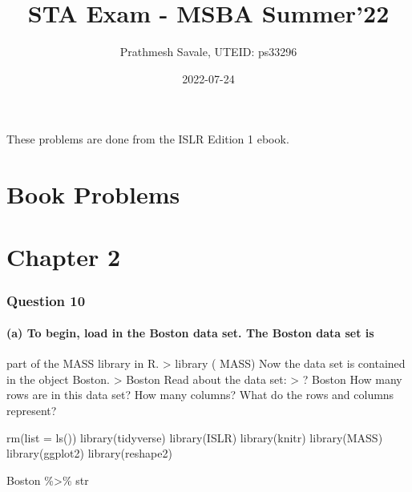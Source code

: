 \documentclass[
]{article}
\title{STA Exam - MSBA Summer'22}
\author{Prathmesh Savale, UTEID: ps33296}
\date{2022-07-24}
\newenvironment{Shaded}{\begin{snugshade}}{\end{snugshade}}
\newcommand{\AttributeTok}[1]{\textcolor[rgb]{0.77,0.63,0.00}{#1}}
\newcommand{\FunctionTok}[1]{\textcolor[rgb]{0.00,0.00,0.00}{#1}}
\newcommand{\NormalTok}[1]{#1}
\newcommand{\SpecialCharTok}[1]{\textcolor[rgb]{0.00,0.00,0.00}{#1}}
\begin{document}
\maketitle

These problems are done from the ISLR Edition 1 ebook.

\hypertarget{book-problems}{%
\section{Book Problems}\label{book-problems}}

\hypertarget{chapter-2}{%
\section{Chapter 2}\label{chapter-2}}

\hypertarget{question-10}{%
\subsubsection{Question 10}\label{question-10}}

\hypertarget{a-to-begin-load-in-the-boston-data-set.-the-boston-data-set-is}{%
\paragraph{(a) To begin, load in the Boston data set. The Boston data
set
is}\label{a-to-begin-load-in-the-boston-data-set.-the-boston-data-set-is}}

part of the MASS library in R. \textgreater{} library ( MASS) Now the
data set is contained in the object Boston. \textgreater{} Boston Read
about the data set: \textgreater{} ? Boston How many rows are in this
data set? How many columns? What do the rows and columns represent?

\begin{Shaded}
\begin{Highlighting}[]
\FunctionTok{rm}\NormalTok{(}\AttributeTok{list =} \FunctionTok{ls}\NormalTok{())}
\FunctionTok{library}\NormalTok{(tidyverse)}
\FunctionTok{library}\NormalTok{(ISLR)}
\FunctionTok{library}\NormalTok{(knitr)}
\FunctionTok{library}\NormalTok{(MASS)}
\FunctionTok{library}\NormalTok{(ggplot2)}
\FunctionTok{library}\NormalTok{(reshape2)}

\NormalTok{Boston }\SpecialCharTok{\%\textgreater{}\%}\NormalTok{ str}
\end{Highlighting}
\end{Shaded}
\end{document}
